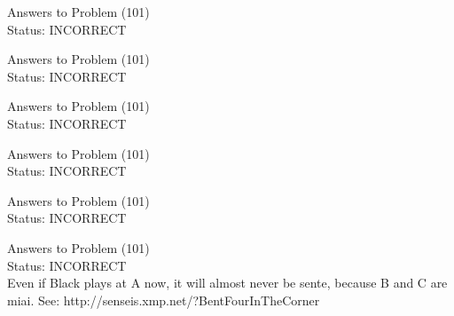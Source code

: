 \documentclass[11pt]{article}
\begin{document}
\begin{minipage}[t]{0.5\textwidth}
  {\centering
  
  Answers to Problem (101)\\
  Status: INCORRECT\\
  
  }
\end{minipage}
\begin{minipage}[t]{0.5\textwidth}
  {\centering
  
  Answers to Problem (101)\\
  Status: INCORRECT\\
  
  }
\end{minipage}
\begin{minipage}[t]{0.5\textwidth}
  {\centering
  
  Answers to Problem (101)\\
  Status: INCORRECT\\
  
  }
\end{minipage}
\begin{minipage}[t]{0.5\textwidth}
  {\centering
  
  Answers to Problem (101)\\
  Status: INCORRECT\\
  
  }
\end{minipage}
\begin{minipage}[t]{0.5\textwidth}
  {\centering
  
  Answers to Problem (101)\\
  Status: INCORRECT\\
  
  }
\end{minipage}
\begin{minipage}[t]{0.5\textwidth}
  {\centering
  
  Answers to Problem (101)\\
  Status: INCORRECT\\
  Even if Black plays at A now, it will almost never be sente, because B and C are miai. See: http://senseis.xmp.net/?BentFourInTheCorner\\
  }
\end{minipage}
\end{document}
